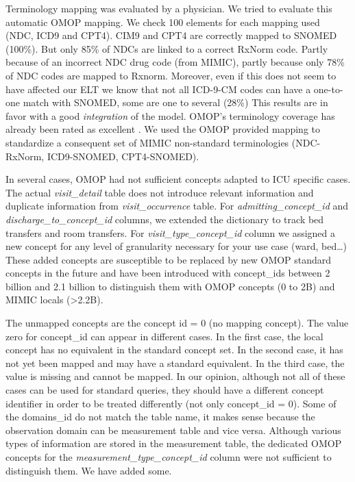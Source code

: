 Terminology mapping was evaluated by a physician. 
We tried to evaluate this automatic OMOP mapping. We check 100 elements for each 
mapping used (NDC, ICD9 and CPT4). CIM9 and CPT4 are correctly mapped to SNOMED 
(100\%). But only 85\% of NDCs are linked to a correct RxNorm code. 
Partly because of an incorrect NDC drug code (from MIMIC), partly because only 78\% 
of NDC codes are mapped to Rxnorm. Moreover, even if this does not seem to have 
affected our ELT we know that not all ICD-9-CM codes can have a one-to-one match 
with SNOMED, some are one to several (28\%) \cite{snomed-icd9}
This results are in favor with a good \textit{integration} of the model.
OMOP's terminology coverage has already been rated as excellent
\cite{omop-vs-pcornet}. We used the OMOP provided mapping to standardize a
consequent set of MIMIC non-standard terminologies (NDC-RxNorm, ICD9-SNOMED,
CPT4-SNOMED). 

In several cases, OMOP had not sufficient concepts adapted to ICU specific
cases. The actual \textit{visit\_detail} table does not introduce relevant
information and duplicate information from \textit{visit\_occurrence} table.
For \textit{admitting\_concept\_id} and \textit{discharge\_to\_concept\_id}
columns, we extended the dictionary to track bed transfers and room transfers.
For \textit{visit\_type\_concept\_id} column we assigned a new concept for any
level of granularity necessary for your use case (ward, bed\ldots) These added
concepts are susceptible to be replaced by new OMOP standard concepts in the
future and have been introduced with concept\_ids between 2 billion and 2.1
billion to distinguish them with OMOP concepts (0 to 2B) and MIMIC locals
(>2.2B).

The unmapped concepts are the concept id = 0 (no mapping concept).  The value
zero for concept\_id can appear in different cases. In the first case, the
local concept has no equivalent in the standard concept set. In the second
case, it has not yet been mapped and may have a standard equivalent. In the
third case, the value is missing and cannot be mapped. In our opinion, although
not all of these cases can be used for standard queries, they should have a
different concept identifier in order to be treated differently (not only
concept\_id = 0). Some of the domains\_id do not match the table name, it makes
sense because the observation domain can be measurement table and vice versa.
Although various types of information are stored in the measurement table, the
dedicated OMOP concepts for the \textit{measurement\_type\_concept\_id} column
were not sufficient to distinguish them. We have added some. 

